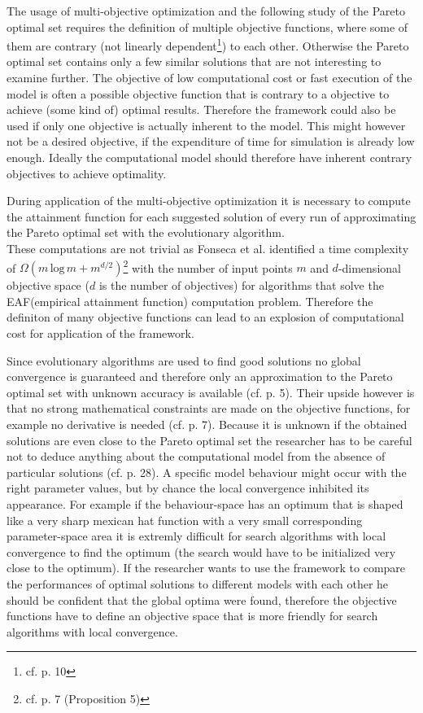 \documentclass[12pt,twoside]{article}
\theoremstyle{plain}
\theoremstyle{definition}
\theoremstyle{remark}
\begin{document}
The usage of multi-objective optimization and the following study of the Pareto optimal set requires the definition of multiple objective functions, where some of them are contrary (not linearly dependent\footnote{cf. \cite{doncieux2015multi} p. 10}) to each other. Otherwise the Pareto optimal set contains only a few similar solutions that are not interesting to examine further. The objective of low computational cost or fast execution of the model is often a possible objective function that is contrary to a objective to achieve (some kind of) optimal results. Therefore the framework could also be used if only one objective is actually inherent to the model. This might however not be a desired objective, if the expenditure of time for simulation is already low enough. Ideally the computational model should therefore have inherent contrary objectives to achieve optimality.\medskip

During application of the multi-objective optimization it is necessary to compute the attainment function for each suggested solution of every run of approximating the Pareto optimal set with the evolutionary algorithm.\\
These computations are not trivial as Fonseca et al. identified a time complexity of $\Omega(m\,\mbox{log}\,m+m^{d/2})$\footnote{cf. \cite{fonseca2011computation} p. 7 (Proposition 5)} with the number of input points $m$ and $d$-dimensional objective space ($d$ is the number of objectives) for algorithms that solve the EAF(empirical attainment function) computation problem.
Therefore the definiton of many objective functions can lead to an explosion of computational cost for application of the framework.\medskip

Since evolutionary algorithms are used to find good solutions no global convergence is guaranteed and therefore only an approximation to the Pareto optimal set with unknown accuracy is available (cf. \cite{doncieux2015multi} p. 5). Their upside however is that no strong mathematical constraints are made on the objective functions, for example no derivative is needed (cf. \cite{doncieux2015multi} p. 7).
Because it is unknown if the obtained solutions are even close to the Pareto optimal set the researcher has to be careful not to deduce anything about the computational model from the absence of particular solutions (cf. \cite{doncieux2015multi} p. 28).
A specific model behaviour might occur with the right parameter values, but by chance the local convergence inhibited its appearance.
For example if the behaviour-space has an optimum that is shaped like a very sharp mexican hat function with a very small corresponding parameter-space area it is extremly difficult for search algorithms with local convergence to find the optimum (the search would have to be initialized very close to the optimum).
If the researcher wants to use the framework to compare the performances of optimal solutions to different models with each other he should be confident that the global optima were found, therefore the objective functions have to define an objective space that is more friendly for search algorithms with local convergence.\medskip
\end{document}
